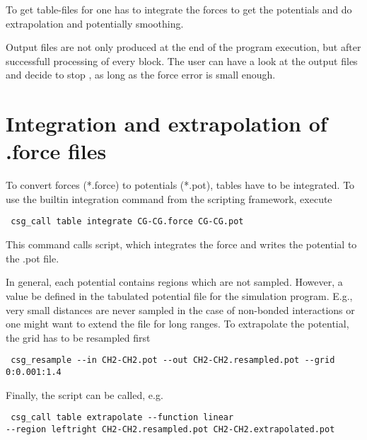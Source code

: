 To get table-files for \gromacs one has to integrate the forces to get the potentials and do extrapolation and potentially smoothing.

Output files are not only produced at the end of the program execution, but after successfull processing of every block. The user can have a look at the output files and decide to stop , as long as the force error is small enough.

\section{Integration and extrapolation of .force files }
To convert forces (*.force) to potentials (*.pot), tables have to be integrated. To use the builtin integration command from the scripting framework, execute
\begin{verbatim}
 csg_call table integrate CG-CG.force CG-CG.pot
\end{verbatim}

This command calls  script, which integrates the force and writes the potential to the .pot file.

In general, each potential contains regions which are not sampled. However, a value be defined in the tabulated potential file for the simulation program. E.g., very small distances are never sampled in the case of non-bonded interactions or one might want to extend the file for long ranges. To extrapolate the potential, the grid has to be resampled first
\begin{verbatim}
 csg_resample --in CH2-CH2.pot --out CH2-CH2.resampled.pot --grid 0:0.001:1.4
\end{verbatim}

Finally, the  script can be called, e.g.
\begin{verbatim}
 csg_call table extrapolate --function linear
--region leftright CH2-CH2.resampled.pot CH2-CH2.extrapolated.pot
\end{verbatim}
